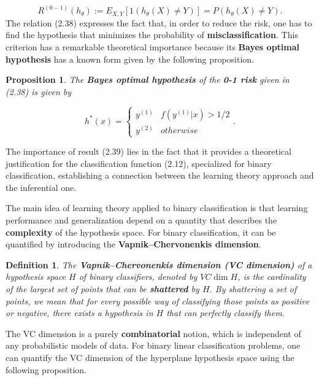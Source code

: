 \documentclass{report}
\newtheorem{definition}{Definition}[chapter]
\newtheorem{proposition}{Proposition}[chapter]
\begin{document}
\begin{equation}
R^{(0-1)}(h_\theta) := E_{X,Y}[1(h_\theta(X) \neq Y)] = P(h_\theta(X) \neq Y).
\end{equation}
The relation (2.38) expresses the fact that, in order to reduce the risk, one has to find the hypothesis that minimizes the probability of \textbf{misclassification}. This criterion has a remarkable theoretical importance because its \textbf{Bayes optimal hypothesis} has a known form given by the following proposition.

\begin{proposition}
The \textbf{Bayes optimal hypothesis} of the \textbf{0-1 risk} given in (2.38) is given by

\begin{equation}
h^*(x) = \left\{\begin{matrix}
y^{(1)} & f(y^{(1)}|x) > 1/2\\
y^{(2)} & otherwise
\end{matrix}\right..
\end{equation}
\end{proposition}
The importance of result (2.39) lies in the fact that it provides a theoretical justification for the classification function (2.12), specialized for binary classification, establishing a connection between the learning theory approach and the inferential one.

The main idea of learning theory applied to binary classification is that learning performance and generalization depend on a quantity that describes the \textbf{complexity} of the hypothesis space.
For binary classification, it can be quantified by introducing the \textbf{Vapnik–Chervonenkis dimension}.

\begin{definition}
The \textbf{Vapnik–Chervonenkis dimension (VC dimension)} of a hypothesis space $H$ of binary classifiers, denoted by $VC\dim H$, is the cardinality of the largest set of points that can be \textbf{shattered} by $H$. By shattering a set of points, we mean that for every possible way of classifying those points as positive or negative, there exists a hypothesis in $H$ that can perfectly classify them.
\end{definition}
The VC dimension is a purely \textbf{combinatorial} notion, which is independent of any probabilistic models of data. For binary linear classification problems, one can quantify the VC dimension of the hyperplane hypothesis space using the following proposition.
\end{document}
